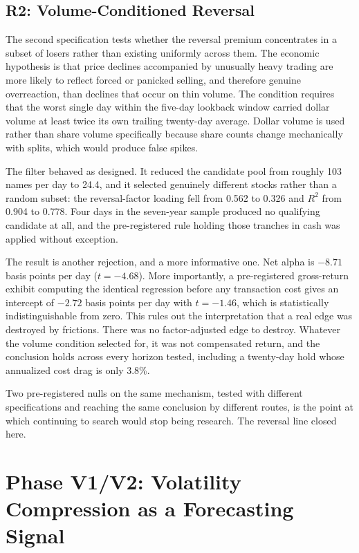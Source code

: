 \documentclass[11pt]{article}
\begin{document}
\subsection{R2: Volume-Conditioned Reversal}

The second specification tests whether the reversal premium concentrates in a subset of losers rather than existing uniformly across them. The economic hypothesis is that price declines accompanied by unusually heavy trading are more likely to reflect forced or panicked selling, and therefore genuine overreaction, than declines that occur on thin volume. The condition requires that the worst single day within the five-day lookback window carried dollar volume at least twice its own trailing twenty-day average. Dollar volume is used rather than share volume specifically because share counts change mechanically with splits, which would produce false spikes.

The filter behaved as designed. It reduced the candidate pool from roughly 103 names per day to 24.4, and it selected genuinely different stocks rather than a random subset: the reversal-factor loading fell from 0.562 to 0.326 and $R^2$ from 0.904 to 0.778. Four days in the seven-year sample produced no qualifying candidate at all, and the pre-registered rule holding those tranches in cash was applied without exception.

The result is another rejection, and a more informative one. Net alpha is $-8.71$ basis points per day ($t = -4.68$). More importantly, a pre-registered gross-return exhibit computing the identical regression before any transaction cost gives an intercept of $-2.72$ basis points per day with $t = -1.46$, which is statistically indistinguishable from zero. This rules out the interpretation that a real edge was destroyed by frictions. There was no factor-adjusted edge to destroy. Whatever the volume condition selected for, it was not compensated return, and the conclusion holds across every horizon tested, including a twenty-day hold whose annualized cost drag is only 3.8\%.

Two pre-registered nulls on the same mechanism, tested with different specifications and reaching the same conclusion by different routes, is the point at which continuing to search would stop being research. The reversal line closed here.
\section{Phase V1/V2: Volatility Compression as a Forecasting Signal}
\end{document}
